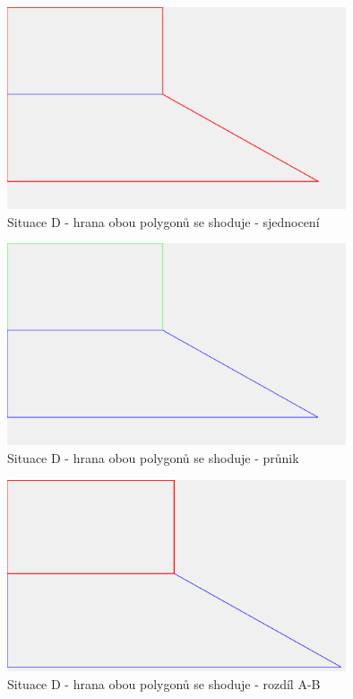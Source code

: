 \documentclass[a4paper,11pt,twoside]{article}
\begin{document}
\vspace{0.2cm}
\begin{figure}[hbt!] 
\begin{center}
\includegraphics[width=10cm]{pictures/D_union_v2.png} 
\caption[Situace D - hrana obou polygonů se shoduje - sjednocení]{Situace D - hrana obou polygonů se shoduje - sjednocení}
\label{fig:D_union}
\end{center}
\end{figure}

\vspace{0.2cm}
\begin{figure}[hbt!] 
\begin{center}
\includegraphics[width=10cm]{pictures/D_intersect_v2.png} 
\caption[Situace D - hrana obou polygonů se shoduje - průnik]{Situace D - hrana obou polygonů se shoduje - průnik}
\label{fig:D_intersect}
\end{center}
\end{figure}

\vspace{0.2cm}
\begin{figure}[hbt!] 
\begin{center}
\includegraphics[width=10cm]{pictures/D_diffAB.png} 
\caption[Situace D - hrana obou polygonů se shoduje - rozdíl A-B]{Situace D - hrana obou polygonů se shoduje - rozdíl A-B}
\label{fig:D_diffAB}
\end{center}
\end{figure}
\end{document}
